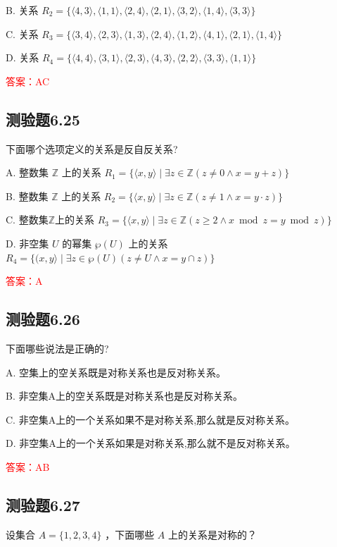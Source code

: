 \documentclass[UTF8, heading=true]{ctexart}
\begin{document}
B. 关系 $R_2=\{\langle 4,3\rangle,\langle 1,1\rangle,\langle 2,4\rangle,\langle 2,1\rangle,\langle 3,2\rangle,\langle 1,4\rangle,\langle 3,3\rangle\}$

C. 关系 $R_3=\{\langle 3,4\rangle,\langle 2,3\rangle,\langle 1,3\rangle,\langle 2,4\rangle,\langle 1,2\rangle,\langle 4,1\rangle,\langle 2,1\rangle,\langle 1,4\rangle\}$

D. 关系 $R_4=\{\langle 4,4\rangle,\langle 3,1\rangle,\langle 2,3\rangle,\langle 4,3\rangle,\langle 2,2\rangle,\langle 3,3\rangle,\langle 1,1\rangle\}$


\textcolor{red}{答案：AC}

\subsection{测验题6.25}
下面哪个选项定义的关系是反自反关系?

A. 整数集 $\mathbb{Z}$ 上的关系 $R_1=\{\langle x, y\rangle \mid \exists z \in \mathbb{Z}(z \neq 0 \wedge x=y+z)\}$

B. 整数集 $\mathbb{Z}$ 上的关系 $R_2=\{\langle x, y\rangle \mid \exists z \in \mathbb{Z}(z \neq 1 \wedge x=y \cdot z)\}$

C. 整数集$\mathbb{Z}$上的关系 $R_3=\{\langle x, y\rangle \mid \exists z \in \mathbb{Z}(z \geq 2 \wedge x \bmod z=y \bmod z)\}$

D. 非空集 $U$ 的幂集 $\wp(U)$ 上的关系 $R_4=\{(x, y\rangle \mid \exists z \in \wp(U)(z \neq U \wedge x=y \cap z)\}$

\textcolor{red}{答案：A}

\subsection{测验题6.26}

下面哪些说法是正确的?

A. 空集上的空关系既是对称关系也是反对称关系。

B. 非空集A上的空关系既是对称关系也是反对称关系。

C. 非空集A上的一个关系如果不是对称关系,那么就是反对称关系。

D. 非空集A上的一个关系如果是对称关系,那么就不是反对称关系。

\textcolor{red}{答案：AB}

\subsection{测验题6.27}

设集合 $A=\{1,2,3,4\}$ ，下面哪些 $A$ 上的关系是对称的？
\end{document}
